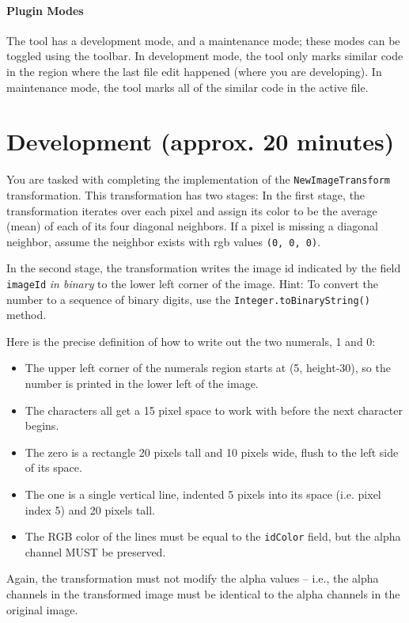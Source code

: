 \documentclass[12pt]{article}
\begin{document}
\paragraph{Plugin Modes}
The tool has a development mode, and a maintenance mode; these modes
can be toggled using the toolbar. In development mode, the tool only
marks similar code in the region where the last file edit happened
(where you are developing). In maintenance mode, the tool marks all of
the similar code in the active file.

\section{Development (approx. 20 minutes)}

You are tasked with completing the implementation of the
\verb|NewImageTransform| transformation.  This transformation has two
stages: In the first stage, the transformation iterates over each
pixel and assign its color to be the average (mean) of each of its
four diagonal neighbors. If a pixel is missing a diagonal neighbor,
assume the neighbor exists with rgb values \verb|(0, 0, 0)|.

In the second stage, the transformation
writes the image id indicated by the field \verb|imageId| \textit{in binary} to the lower
left corner of the image.  Hint: To convert the number to a sequence of binary digits, use the 
\verb|Integer.toBinaryString()| method.


Here is the precise definition of how to
write out the two numerals, 1 and 0:

\begin{itemize}
\item The upper left corner of the numerals region starts at (5,
  height-30), so the number is printed in the lower left of the image.
\item The characters all get a 15 pixel space to work with before the
  next character begins.
\item The zero is a rectangle 20 pixels tall and 10 pixels wide, flush
  to the left side of its space.
\item The one is a single vertical line, indented 5 pixels into its
  space (i.e. pixel index 5) and 20 pixels tall.
\item The RGB color of the lines must be equal to the \verb|idColor|
  field, but the alpha channel MUST be preserved.
\end{itemize}

Again, the transformation must not modify the alpha values -- i.e.,
the alpha channels in the transformed image must be identical to the
alpha channels in the original image.
\end{document}
